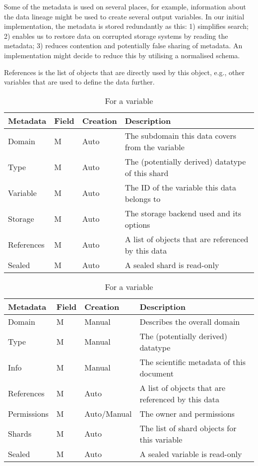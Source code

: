 Some of the metadata is used on several places, for example, information about the data lineage might be used to create several output variables.
In our initial implementation, the metadata is stored redundantly as this:
1) simplifies search; 2) enables us to restore data on corrupted storage systems by reading the metadata; 3) reduces contention and potentially false sharing of metadata.
An implementation might decide to reduce this by utilising a normalised schema.

References is the list of objects that are directly used by this object, e.g., other variables that are used to define the data further.

\begin{table}
\begin{subtable}[t]{\textwidth}
\begin{tabular}{llll}
Metadata & Field & Creation & Description\\
\hline
Domain   & M & Auto & The subdomain this data covers from the variable\\
Type     & M & Auto & The (potentially derived) datatype of this shard\\
Variable & M & Auto & The ID of the variable this data belongs to\\
Storage  & M & Auto & The storage backend used and its options\\
References & M & Auto & A list of objects that are referenced by this data\\
Sealed   & M & Auto & A sealed shard is read-only\\
\end{tabular}
\caption{For a shard}
\end{subtable}

\begin{subtable}[t]{\textwidth}
\begin{tabular}{llll}
Metadata & Field & Creation & Description\\
\hline
Domain      & M & Manual & Describes the overall domain\\
Type   	    & M & Manual & The (potentially derived) datatype\\
Info   	    & M & Manual & The scientific metadata of this document\\
References  & M & Auto & A list of objects that are referenced by this data\\
Permissions & M & Auto/Manual & The owner and permissions \\
Shards      & M & Auto & The list of shard objects for this variable\\
Sealed      & M & Auto & A sealed variable is read-only\\
\end{tabular}
\caption{For a variable}
\end{subtable}


\end{table}
